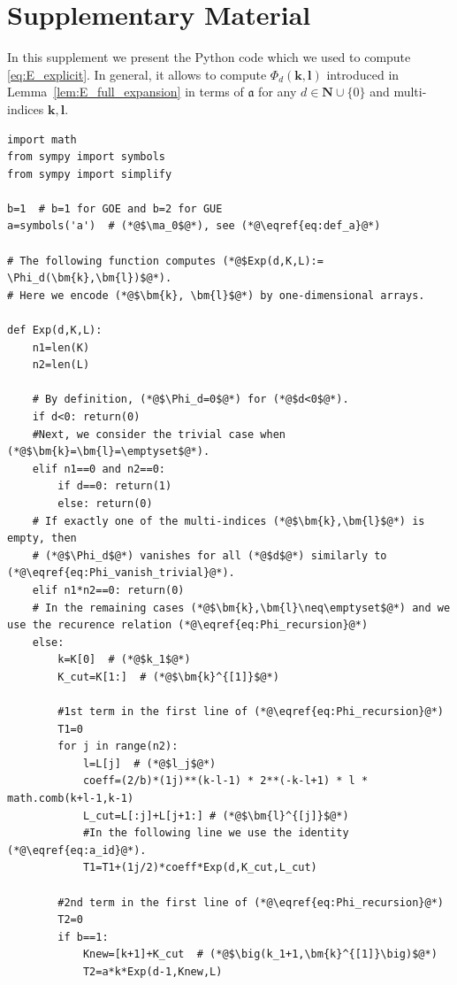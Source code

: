 \documentclass[10pt]{amsart}
\numberwithin{equation}{section}
\newcommand{\N}{\mathbf{N}}
\newcommand{\ma}{\mathfrak{a}}
\begin{document}
 



\clearpage

\section*{Supplementary Material}

\setcounter{section}{0}
\renewcommand{\thesection}{S\arabic{section}}
\renewcommand{\sectionname}{Section}


In this supplement we present the Python code which we used to compute \eqref{eq:E_explicit}. In general, it allows to compute $\Phi_d(\bm{k},\bm{l})$ introduced in Lemma~\ref{lem:E_full_expansion} in terms of $\ma$ for any $d\in\N\cup\{0\}$ and multi-indices $\bm{k},\bm{l}$.

\begin{lstlisting}
import math
from sympy import symbols
from sympy import simplify

b=1  # b=1 for GOE and b=2 for GUE
a=symbols('a')  # (*@$\ma_0$@*), see (*@\eqref{eq:def_a}@*)

# The following function computes (*@$Exp(d,K,L):= \Phi_d(\bm{k},\bm{l})$@*). 
# Here we encode (*@$\bm{k}, \bm{l}$@*) by one-dimensional arrays.

def Exp(d,K,L):
    n1=len(K)
    n2=len(L)
    
    # By definition, (*@$\Phi_d=0$@*) for (*@$d<0$@*).
    if d<0: return(0)
    #Next, we consider the trivial case when (*@$\bm{k}=\bm{l}=\emptyset$@*).
    elif n1==0 and n2==0: 
        if d==0: return(1)
        else: return(0)
    # If exactly one of the multi-indices (*@$\bm{k},\bm{l}$@*) is empty, then 
    # (*@$\Phi_d$@*) vanishes for all (*@$d$@*) similarly to (*@\eqref{eq:Phi_vanish_trivial}@*).
    elif n1*n2==0: return(0)    
    # In the remaining cases (*@$\bm{k},\bm{l}\neq\emptyset$@*) and we use the recurence relation (*@\eqref{eq:Phi_recursion}@*)
    else:
        k=K[0]  # (*@$k_1$@*)
        K_cut=K[1:]  # (*@$\bm{k}^{[1]}$@*)
        
        #1st term in the first line of (*@\eqref{eq:Phi_recursion}@*)
        T1=0
        for j in range(n2):
            l=L[j]  # (*@$l_j$@*)
            coeff=(2/b)*(1j)**(k-l-1) * 2**(-k-l+1) * l * math.comb(k+l-1,k-1)
            L_cut=L[:j]+L[j+1:] # (*@$\bm{l}^{[j]}$@*)
            #In the following line we use the identity (*@\eqref{eq:a_id}@*).
            T1=T1+(1j/2)*coeff*Exp(d,K_cut,L_cut)
        
        #2nd term in the first line of (*@\eqref{eq:Phi_recursion}@*)
        T2=0
        if b==1:
            Knew=[k+1]+K_cut  # (*@$\big(k_1+1,\bm{k}^{[1]}\big)$@*)
            T2=a*k*Exp(d-1,Knew,L)
                

\end{lstlisting}
\end{document}
